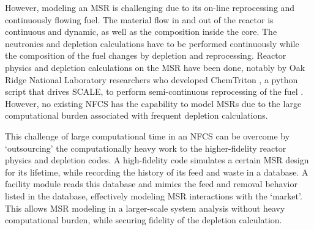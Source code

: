 However, modeling an \gls{MSR} is challenging due to its on-line reprocessing
and continuously flowing fuel.
The material flow in and out of the reactor is continuous and dynamic, as well as the
composition inside the core.
The neutronics and depletion calculations have to be performed continuously while
the composition of the fuel changes by depletion and reprocessing.
Reactor physics and depletion calculations
on the \gls{MSR} have been done, notably by 
 Oak Ridge National Laboratory researchers who developed
ChemTriton \cite{powers_new_2013}, a python script that drives SCALE,
to perform semi-continuous reprocessing of the fuel \cite{powers_inventory_2014, betzler_fuel_2018}.
However, no existing \gls{NFCS} has the capability to model \glspl{MSR}
due to the large computational burden associated with frequent depletion calculations.

This challenge of large computational time in an \gls{NFCS} can be overcome by `outsourcing' the computationally
heavy work to the higher-fidelity reactor physics and depletion codes. 
A high-fidelity code simulates a certain
\gls{MSR} design for its lifetime, while recording the history of its feed and waste in a
database. A \Cyclus facility module reads this database and mimics the feed and removal
behavior listed in the database, effectively modeling \gls{MSR} interactions with the `market'.
This allows \gls{MSR} modeling in a larger-scale system analysis without heavy computational
burden, while securing fidelity of the depletion calculation.